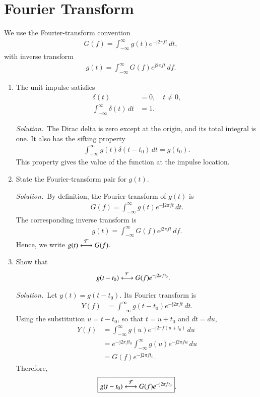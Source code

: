 \documentclass[journal,12pt,twocolumn]{IEEEtran}
\renewcommand\thesection{\arabic{section}}
\newcommand{\jj}{\mathrm{j}}
\providecommand{\solution}{\par\noindent\textit{Solution.}\ }
\begin{document}
\section{Fourier Transform}

We use the Fourier-transform convention
\begin{align}
    G(f)=\int_{-\infty}^{\infty}g(t)e^{-\jj2\pi ft}\,dt,
    \label{eq:ft-definition}
\end{align}
with inverse transform
\begin{align}
    g(t)=\int_{-\infty}^{\infty}G(f)e^{\jj2\pi ft}\,df.
\end{align}

\begin{enumerate}[label=\thesection.\arabic*,ref=\thesection.\theenumi]

\item The unit impulse satisfies
\begin{align}
    \delta(t)&=0,\quad t\neq 0,\\
    \int_{-\infty}^{\infty}\delta(t)\,dt&=1.
\end{align}

\solution The Dirac delta is zero except at the origin, and its total
integral is one. It also has the sifting property
\begin{align}
    \int_{-\infty}^{\infty}g(t)\delta(t-t_0)\,dt=g(t_0).
\end{align}
This property gives the value of the function at the impulse location.

\item State the Fourier-transform pair for $g(t)$.

\solution By definition, the Fourier transform of $g(t)$ is
\begin{align}
    G(f)=\int_{-\infty}^{\infty}g(t)e^{-\jj2\pi ft}\,dt.
\end{align}
The corresponding inverse transform is
\begin{align}
    g(t)=\int_{-\infty}^{\infty}G(f)e^{\jj2\pi ft}\,df.
\end{align}
Hence, we write $g(t)\overset{\mathcal{F}}{\longleftrightarrow}G(f)$.

\item Show that
\begin{align}
    g(t-t_0)&\system{F}G(f)e^{-\jj2\pi ft_0}.
\end{align}

\solution Let $y(t)=g(t-t_0)$. Its Fourier transform is
\begin{align}
    Y(f)&=\int_{-\infty}^{\infty}g(t-t_0)e^{-\jj2\pi ft}\,dt.
\end{align}
Using the substitution $u=t-t_0$, so that $t=u+t_0$ and $dt=du$,
\begin{align}
    Y(f)&=\int_{-\infty}^{\infty}g(u)e^{-\jj2\pi f(u+t_0)}\,du\\
    &=e^{-\jj2\pi ft_0}\int_{-\infty}^{\infty}g(u)e^{-\jj2\pi fu}\,du\\
    &=G(f)e^{-\jj2\pi ft_0}.
\end{align}
Therefore,
\begin{align}
    \boxed{g(t-t_0)\system{F}G(f)e^{-\jj2\pi ft_0}}.
\end{align}


\end{enumerate}
\end{document}
